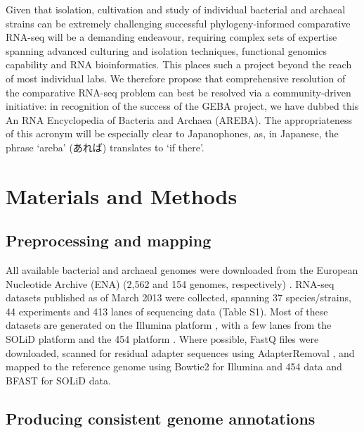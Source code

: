 \documentclass[10pt]{article}
\begin{document}
\begin{CJK}{UTF8}{min}
Given that isolation, cultivation and study of individual bacterial
and archaeal strains can be extremely challenging \cite{Stewart:2012}
successful phylogeny-informed comparative RNA-seq will be a demanding
endeavour, requiring complex sets of expertise spanning advanced
culturing and isolation techniques, functional genomics capability and
RNA bioinformatics. This places such a project beyond the reach of
most individual labs. We therefore propose that comprehensive
resolution of the comparative RNA-seq problem can best be resolved via
a community-driven initiative: in recognition of the success of the
GEBA project, we have dubbed this An RNA Encyclopedia of Bacteria and
Archaea (AREBA). The appropriateness of this acronym will be
especially clear to Japanophones, as, in Japanese, the phrase ‘areba’
(あれば) translates to ‘if there’.
\end{CJK}

\section*{Materials and Methods}

\subsection*{Preprocessing and mapping}

All available bacterial and archaeal genomes were downloaded from the
European Nucleotide Archive (ENA) (2,562 and 154 genomes,
respectively) \cite{Cochrane:2013}. RNA-seq datasets published as of
March 2013 were collected, spanning 37 species/strains, 44 experiments
and 413 lanes of sequencing data (Table S1). Most of these datasets
are generated on the Illumina platform \cite{Shendure:2005}, with a
few lanes from the SOLiD platform \cite{Cloonan:2008} and the 454
platform \cite{Margulies:2005}. Where possible, FastQ files were
downloaded, scanned for residual adapter sequences using
AdapterRemoval \cite{Lindgreen:2012}, and mapped to the reference genome
using Bowtie2 \cite{Langmead:2012} for Illumina and 454 data
and BFAST \cite{Homer:2009} for SOLiD data.

\subsection*{Producing consistent genome annotations}
\end{document}

